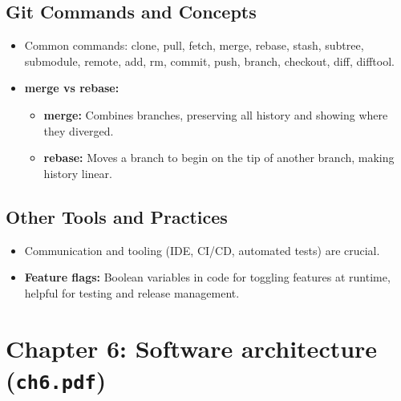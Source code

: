 \documentclass[11pt,a4paper]{article}
\begin{document}
\subsection*{Git Commands and Concepts}
\begin{itemize}
    \item Common commands: clone, pull, fetch, merge, rebase, stash, subtree, submodule, remote, add, rm, commit, push, branch, checkout, diff, difftool.
    \item \textbf{merge vs rebase:}
        \begin{itemize}
            \item \textbf{merge:} Combines branches, preserving all history and showing where they diverged.
            \item \textbf{rebase:} Moves a branch to begin on the tip of another branch, making history linear.
        \end{itemize}
\end{itemize}

\subsection*{Other Tools and Practices}
\begin{itemize}
    \item Communication and tooling (IDE, CI/CD, automated tests) are crucial.
    \item \textbf{Feature flags:} Boolean variables in code for toggling features at runtime, helpful for testing and release management.
\end{itemize}

\section{Chapter 6: Software architecture (\texttt{ch6.pdf})}
\end{document}
